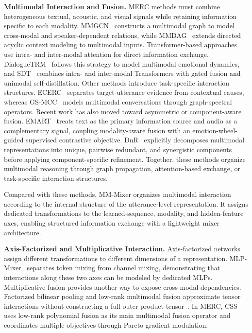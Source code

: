 \documentclass[letterpaper]{article} %
\begin{document}
\noindent\textbf{Multimodal Interaction and Fusion.}
MERC methods must combine heterogeneous textual, acoustic, and visual signals while retaining information specific to each modality. MMGCN~\cite{mmgcn} constructs a multimodal graph to model cross-modal and speaker-dependent relations, while MMDAG~\cite{mmdag} extends directed acyclic context modeling to multimodal inputs. Transformer-based approaches use intra- and inter-modal attention for direct information exchange. DialogueTRM~\cite{dialoguetrm} follows this strategy to model multimodal emotional dynamics, and SDT~\cite{sdt} combines intra- and inter-modal Transformers with gated fusion and unimodal self-distillation. Other methods introduce task-specific interaction structures. ECERC~\cite{ecerc} separates target-utterance evidence from contextual causes, whereas GS-MCC~\cite{gsmcc} models multimodal conversations through graph-spectral operators. Recent work has also moved toward asymmetric or component-aware fusion. EMART~\cite{emart} treats text as the primary information source and audio as a complementary signal, coupling modality-aware fusion with an emotion-wheel-guided supervised contrastive objective. DnR~\cite{dnr} explicitly decomposes multimodal representations into unique, pairwise redundant, and synergistic components before applying component-specific refinement. Together, these methods organize multimodal reasoning through graph propagation, attention-based exchange, or task-specific interaction structures.

Compared with these methods, MM-Mixer organizes multimodal interaction according to the internal structure of the utterance-level representation. It assigns dedicated transformations to the learned-sequence, modality, and hidden-feature axes, enabling structured information exchange with a lightweight mixer architecture.

\noindent\textbf{Axis-Factorized and Multiplicative Interaction.}
Axis-factorized networks assign different transformations to different dimensions of a representation. MLP-Mixer~\cite{mlpmixer} separates token mixing from channel mixing, demonstrating that interactions along these two axes can be modeled by dedicated MLPs. Multiplicative fusion provides another way to expose cross-modal dependencies. Factorized bilinear pooling and low-rank multimodal fusion approximate tensor interactions without constructing a full outer-product tensor~\cite{mfb,lmf}. In MERC, CSS~\cite{css} uses low-rank polynomial fusion as its main multimodal fusion operator and coordinates multiple objectives through Pareto gradient modulation.
\end{document}
